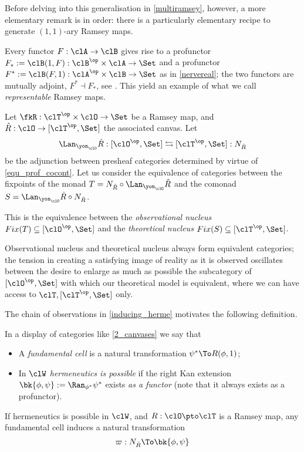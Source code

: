 Before delving into this generalisation in \autoref{multiramsey}, however, a more elementary remark is in order: there is a particularly elementary recipe to generate $(1,1)$-ary Ramsey maps.
\begin{example}
	Every functor $F : \clA \to \clB$ gives rise to a profunctor $F_* := \clB(1,F) : \clB^\op\times \clA\to\Set$ and a profunctor $F^* := \clB(F,1) : \clA^\op\times\clB \to \Set$ as in \autoref{nervereal}; the two functors are mutually adjoint, $F^*\dashv F_*$, see \cite[6.2]{Bor2}. This yield an example of what we call \emph{representable} Ramsey maps.
\end{example}
\begin{definition}\label{nuclei}
	Let $\fkR : \clT^\op\times \clO \to\Set$ be a Ramsey map, and $\hat R : \clO \to [\clT^\op,\Set]$ the associated canvas. Let
	\[ \Lan_{\yon_\clO}\hat R : [\clO^\op,\Set] \leftrightarrows [\clT^\op,\Set] : N_{\hat R} \]
	be the adjunction between presheaf categories determined by virtue of \autoref{equ_prof_cocont}. Let us consider the equivalence of categories between the fixpoints of the monad $T = N_{\hat R}\circ\Lan_{\yon_\clO}\hat R$ and the comonad $S=\Lan_{\yon_\clO}\hat R\circ N_{\hat R}$.
	
	This is the equivalence between the \emph{observational nucleus} $Fix(T)\subseteq [\clO^\op,\Set]$ and the \emph{theoretical nucleus} $Fix(S)\subseteq [\clT^\op,\Set]$.
\end{definition}
\begin{remark}
	Observational nucleus and theoretical nucleus always form equivalent categories; the tension in creating a satisfying image of reality as it is observed oscillates between the desire to enlarge as much as possible the subcategory of $[\clO^\op,\Set]$ with which our theoretical model is equivalent, where we can have access to $\clT, [\clT^\op, \Set]$ only.
\end{remark}
The chain of observations in \autoref{inducing_herme} motivates the following definition.
\begin{definition}
	In a display of categories like \eqref{2_canvases} we say that 
	\begin{itemize}
		\item A \emph{fundamental cell} is a natural transformation $\psi^* \To R(\phi,1)$;
		\item In $\clW$ \emph{hermeneutics is possible} if the right Kan extension $\bk{\phi,\psi} := \Ran_{\phi^*}\psi^*$ exists \emph{as a functor} (note that it always exists as a profunctor).
	\end{itemize}
	If hermeneutics is possible in $\clW$, and $R : \clO \pto \clT$ is a Ramsey map, any fundamental cell induces a natural transformation 
	\[ \varpi : N_{\hat R} \To \bk{\phi,\psi} \]
\end{definition}

